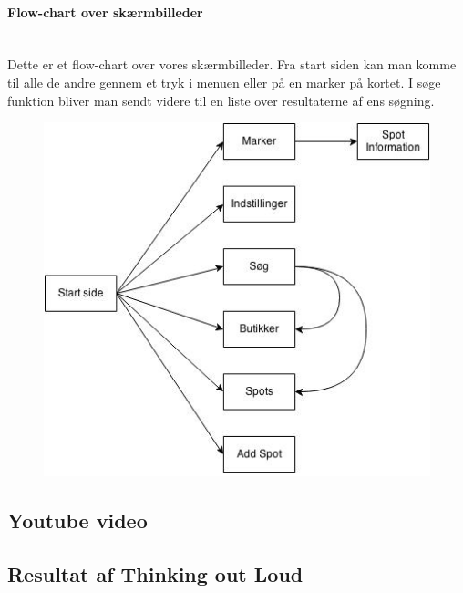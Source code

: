 \documentclass[12pt]{article}
\begin{document}
\newpage
\paragraph{Flow-chart over skærmbilleder}\mbox{}\\
Dette er et flow-chart over vores skærmbilleder. Fra start siden kan man komme til alle de andre gennem et tryk i menuen eller på en marker på kortet. I søge funktion bliver man sendt videre til en liste over resultaterne af ens søgning.
\begin{figure}[h]
\includegraphics[scale = 0.8]{flowDiagram}
\end{figure}
\newpage
\subsection*{Youtube video}

\subsection*{Resultat af Thinking out Loud}

\pagebreak
\end{document}
